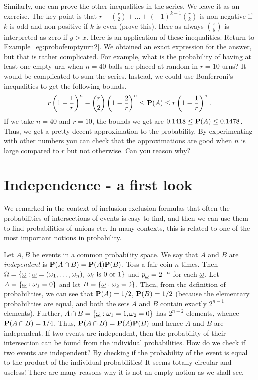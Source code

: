 \documentclass[preprint,  11pt]{amsart}
\def\omeg{\underline{\ome}}
\begin{document}
Similarly, one can prove the other inequalities in the series. We leave it as an exercise. The key point is that $r-\binom{r}{2}+\ldots +(-1)^{k-1}\binom{r}{k}$ is non-negative if $k$ is odd and non-positive if $k$ is even (prove this). Here as always $\binom{x}{y}$ is interpreted as zero if $y>x$.
\eprf
Here is an application of these inequalities.
\beg Return to Example~\ref{eg:probofemptyurn2}. We obtained an exact expression for the answer, but that is rather complicated. For example, what is the probability of having at least one empty urn when $n=40$ balls are placed at random in $r=10$ urns? It would be complicated to sum the series. Instead, we could use Bonferroni's inequalities to get the following bounds.
$$
 r\l(1-\frac{1}{r}\r)^{n}-\binom{r}{2}\l(1-\frac{2}{r}\r)^{n}\le \P(A) \le r\l(1-\frac{1}{r}\r)^{n}.
$$
If we take $n=40$ and $r=10$, the bounds we get are $0.1418\le \P(A)\le 0.1478$. Thus, we get a pretty decent approximation to the probability. By experimenting with other numbers you can check that the approximations are good when $n$ is large compared to $r$ but not otherwise. Can you reason why?
\eeg




\section{Independence - a first look}
We remarked in the context of inclusion-exclusion formulas that often the probabilities of intersections of events is easy to find, and then we can use them to find probabilities of unions etc. In many contexts, this is related to one of the most important notions in probability.

\bdefn Let $A,B$ be events in a common probability space. We say that $A$ and $B$ are {\em independent} is $\P(A\cap B)=\P(A)\P(B)$.
\edefn
\beg Toss a fair coin $n$ times. Then $\Ome=\{\omeg\suchthat \omeg=(\ome_{1},\ldots ,\ome_{n}), \; \ome_{i}\mb{ is }0\mb{ or }1\}$ and $p_{\omeg}=2^{-n}$ for each $\omeg$. Let $A=\{\omeg\suchthat \ome_{1}=0\}$ and let $B=\{\omeg\suchthat \ome_{2}=0\}$. Then, from the definition of probabilities, we can see that $\P(A)=1/2$, $\P(B)=1/2$ (because the elementary probabilities are equal, and both the sets $A$ and $B$ contain exactly $2^{n-1}$ elements). Further, $A\cap B=\{\omeg\suchthat \ome_{1}=1, \ome_{2}=0\}$ has $2^{n-2}$ elements, whence $\P(A\cap B)=1/4$. Thus, $\P(A\cap B)=\P(A)\P(B)$ and hence $A$ and $B$ are independent.
\eeg
If two events are independent, then the probability of their intersection can be found from the individual probabilities. How do we check if two events are independent? By checking if the probability of the event is equal to the product of the individual probabilities! It seems totally circular and useless! There are many reasons why it is not an empty notion as we shall see.
\end{document}
